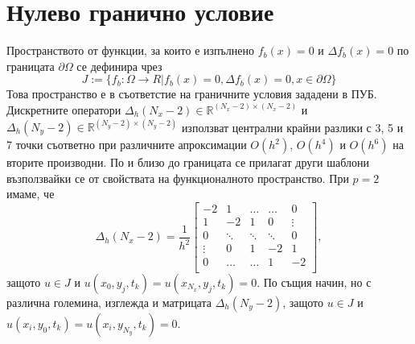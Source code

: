 \documentclass{article}
\newcommand{\be}{\begin{equation}}
\newcommand{\ee}{\end{equation}}
\newcommand{\RR}{\mathbb{R}}
\begin{document}
\section{Нулево гранично условие}

Пространството от функции, за които е изпълнено $f_b(x) = 0$ и $\Delta f_b(x) = 0$ по границата $\partial\Omega$ се дефинира чрез
\be\label{funSpace}
J:=\{ f_b : \Omega \rightarrow R | f_b(x) = 0, \Delta f_b(x) = 0, x \in \partial\Omega\}
\ee
Това пространство е в съответстие на граничните условия зададени в ПУБ. Дискретните оператори $\Delta_h(N_x-2) \in \RR^{(N_x-2) \times (N_x-2)}$ и $\Delta_h(N_y-2) \in \RR^{(N_y-2)\times(N_y-2)}$  използват централни крайни разлики с 3, 5 и 7 точки съответно при различните апроксимации $O(h^2)$, $O(h^4)$ и $O(h^6)$ на вторите производни. По и близо до границата се прилагат други шаблони възползвайки се от свойствата на функционалното пространство. При $p=2$ имаме, че 
\[
\Delta_{h}(N_x-2) = \frac{1}{h^2}
\begin{bmatrix}
    -2	       & 1        &     \dots   &   \dots        & 0   \\
    1               & -2            &   1           &   0               & \vdots    \\
        0           & \ddots        &    \ddots    &   \ddots       &  0 \\ 
    \vdots       &     0            &  1     	& -2    	   & 1 \\
    0               & \dots          &  \dots         & 1  	   & -2 \\
\end{bmatrix},
\]
защото $u \in J$ и $u(x_0, y_j, t_k) = u(x_{N_x}, y_j, t_k) = 0$. По същия начин, но с различна големина, изглежда и матрицата $\Delta_{h}(N_y-2)$, защото $u \in J$ и $u(x_i, y_0, t_k) = u(x_i, y_{N_y}, t_k) = 0$.
\end{document}
